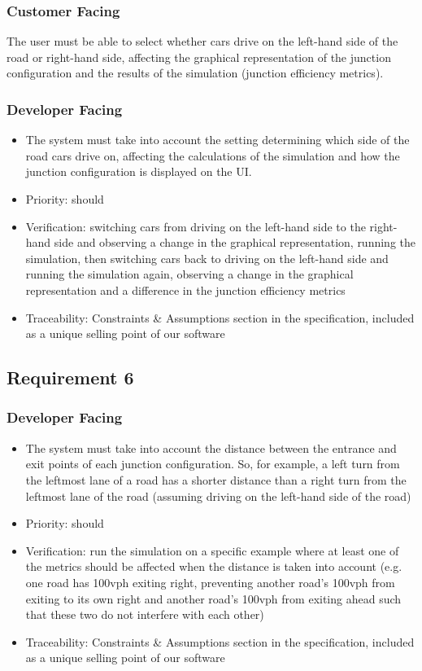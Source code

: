 \documentclass{article}
\begin{document}
\subsubsection{Customer Facing}
The user must be able to select whether cars drive on the left-hand side of 
the road or right-hand side, affecting the graphical representation of the junction
configuration and the results of the simulation (junction efficiency metrics).
\subsubsection{Developer Facing}
\begin{itemize}
  \item The system must take into account the setting determining which side of
  the road cars drive on, affecting the calculations of the simulation and how 
  the junction configuration is displayed on the UI.
  \item Priority: should
  \item Verification: switching cars from driving on the left-hand side to the 
  right-hand side and observing a change in the graphical representation, running 
  the simulation, then switching cars back to driving on the left-hand side and 
  running the simulation again, observing a change in the graphical representation 
  and a difference in the junction efficiency metrics
  \item Traceability: Constraints & Assumptions section in the specification, included 
  as a unique selling point of our software
\end{itemize}

\subsection{Requirement 6}
\subsubsection{Developer Facing}
\begin{itemize}
  \item The system must take into account the distance between the entrance and exit 
  points of each junction configuration. So, for example, a left turn from the 
  leftmost lane of a road has a shorter distance than a right turn from the leftmost 
  lane of the road (assuming driving on the left-hand side of the road)
  \item Priority: should
  \item Verification: run the simulation on a specific example where at least one of 
  the metrics should be affected when the distance is taken into account (e.g. one 
  road has 100vph exiting right, preventing another road’s 100vph from exiting to its
  own right and another road’s 100vph from exiting ahead such that these two do not 
  interfere with each other)
  \item Traceability: Constraints & Assumptions section in the specification, included 
  as a unique selling point of our software
\end{itemize}
\end{document}
